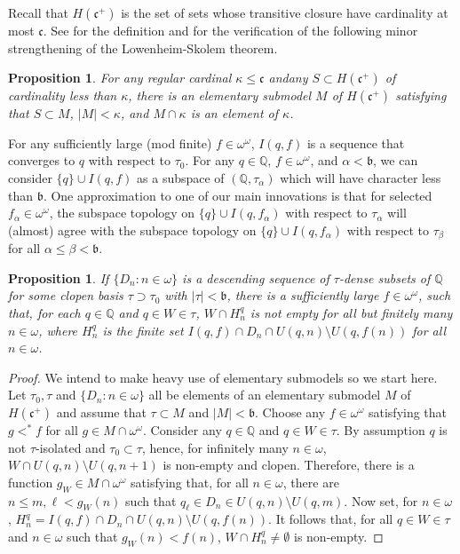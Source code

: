 \documentclass{amsart}
\newtheorem{proposition}[thm]{Proposition}
\theoremstyle{definition}
\theoremstyle{remark}
\begin{document}
Recall that $H(\mathfrak c^+)$ is the set of sets whose transitive
closure have cardinality at most $\mathfrak c$.  See  \cite{Kunen}
for the definition and for the verification of the following
minor strengthening   of the Lowenheim-Skolem theorem.

\begin{proposition} For any regular cardinal $\kappa\leq \mathfrak c$
and\label{getModels}
any $S\subset H(\mathfrak c^+)$ of cardinality less than $\kappa$,
there is an elementary submodel $M$ of $H(\mathfrak c^+)$ satisfying
that $S\subset M$, $|M|<\kappa$, and $M\cap \kappa$ is an element of $\kappa$.
\end{proposition}
   
   For any sufficiently large (mod finite) $f\in\omega^\omega$,
   $I(q,f)$ is  a sequence that converges to $q$ with respect
   to $\tau_0$. For any  $q\in \mathbb Q$, $f\in\omega^\omega$, and $\alpha<\mathfrak b$,
    we can consider $\{q\}\cup I(q,f)$ as a subspace of $
    (\mathbb Q, \tau_\alpha)$ which will have character less than $\mathfrak b$. 
 One approximation to one of our main innovations is that for selected
 $f_\alpha\in\omega^\omega$, the subspace topology on $\{q\}\cup
  I(q,f_\alpha)$ with respect to $\tau_\alpha$ will (almost) agree
  with the subspace 
   topology on $\{q\}\cup
  I(q,f_\alpha)$ with respect to $\tau_\beta$ for all $\alpha
  \leq\beta< \mathfrak b$. 

  \begin{proposition} If $\{ D_n : n\in\omega\}$ is a  descending
  sequence of $\tau $-dense subsets of $\mathbb Q$
  for some clopen basis $\tau\supset\tau_0$ with $|\tau|<\mathfrak b$,
  there is a sufficiently
  large $f\in\omega^\omega$, such that, for each $q\in \mathbb Q$ and
  $q\in W\in \tau$,  $W\cap H^q_n $ is not empty
  for all but finitely many $n\in\omega$,
   where $H^q_n$ is the finite set $  I(q,f)\cap D_n \cap 
   U(q,n)\setminus U(q, {f(n)})$
   for all $n\in\omega$.    
  \end{proposition}

 \begin{proof}
We intend to make heavy use of elementary submodels so we start here.
Let  $\tau_0,
\tau $ and $\{ D_n : n\in\omega\}$ all be elements of an
elementary submodel $M$ of $H(\mathfrak c^+)$ and assume that
$\tau \subset M$ and 
$|M|<\mathfrak b$. 
Choose any $f\in\omega^\omega$ satisfying that $g<^* f$ for all 
 $g\in M\cap \omega^\omega$.  Consider any  $q\in \mathbb Q$
 and $q\in
 W\in \tau $. By assumption $q$ is not $\tau $-isolated
 and $\tau_0\subset\tau $, hence, for infinitely
 many $n\in\omega$,  
   $W\cap U(q,n)\setminus U(q,n{+}1)$
 is non-empty and clopen. 
 Therefore,
  there is a function $g_W\in M\cap \omega^\omega$  
  satisfying that, for all $n\in\omega$,
   there are $n\leq m,\ell<g_W(n)$ such 
   that $ q_\ell\in D_n\in U(q,n)\setminus U(q,m)$. 
Now set, for $n\in\omega$, $H^q_n = I(q,f)\cap D_n\cap
  U(q,n)\setminus U(q, {f(n)})$. It follows that, for all 
   $q\in W\in \tau$ and $n\in\omega$ such
   that $g_W(n)<f(n)$, 
   $W\cap H^q_n\neq\emptyset$ is non-empty. 
 \end{proof}
\end{document}
